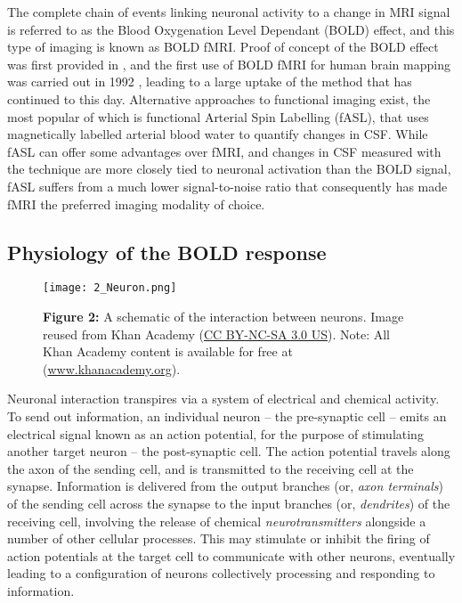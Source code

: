 The complete chain of events linking neuronal activity to a change in MRI signal is referred to as the Blood Oxygenation Level Dependant (BOLD) effect, and this type of imaging is known as BOLD fMRI.  Proof of concept of the BOLD effect was first provided in \citet*{Ogawa1990-it}, and the first use of BOLD fMRI for human brain mapping was carried out in 1992 \citep{Bandettini1992-jt, Kwong1992-uq, Ogawa1992-af}, leading to a large uptake of the method that has continued to this day. Alternative approaches to functional imaging exist, the most popular of which is functional Arterial Spin Labelling (fASL), that uses magnetically labelled arterial blood water to quantify changes in CSF. While fASL can offer some advantages over fMRI, and changes in CSF measured with the technique are more closely tied to neuronal activation than the BOLD signal, fASL suffers from a much lower signal-to-noise ratio that consequently has made fMRI the preferred imaging modality of choice. 

\subsection{Physiology of the BOLD response}

\begin{figure}[htbp]
\centering
	\texttt{[image: 2\_Neuron.png]}	
\caption*{\textbf{Figure 2:} A schematic of the interaction between neurons. Image reused from Khan Academy (\href{https://creativecommons.org/licenses/by-nc-sa/3.0/us/}{CC BY-NC-SA 3.0 US}). Note: All Khan Academy content is available for free at (\href{https://www.khanacademy.org/}{www.khanacademy.org}).}
\end{figure}

Neuronal interaction transpires via a system of electrical and chemical activity. To send out information, an individual neuron -- the pre-synaptic cell -- emits an electrical signal known as an action potential, for the purpose of stimulating another target neuron -- the post-synaptic cell. The action potential travels along the axon of the sending cell, and is transmitted to the receiving cell at the synapse. Information is delivered from the output branches (or, \textit{axon terminals}) of the sending cell across the synapse to the input branches (or, \textit{dendrites}) of the receiving cell, involving the release of chemical \textit{neurotransmitters} alongside a number of other cellular processes. This may stimulate or inhibit the firing of action potentials at the target cell to communicate with other neurons, eventually leading to a configuration of neurons collectively processing and responding to information. 

